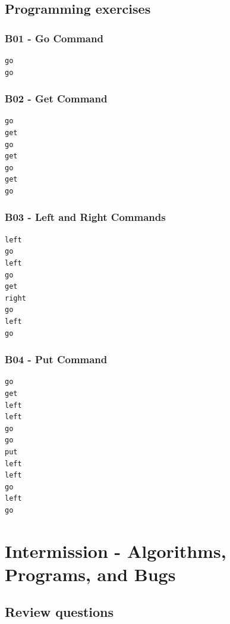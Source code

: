 \documentclass[article,A4,12pt]{llncs}
\begin{document}
\subsection{Programming exercises}

\subsubsection*{B01 - Go Command}
\begin{verbatim}
go
go
\end{verbatim}

\subsubsection{B02 - Get Command}
\begin{verbatim}
go
get
go
get
go
get 
go
\end{verbatim}

\subsubsection{B03 - Left and Right Commands}
\begin{verbatim}
left
go
left
go
get
right
go
left
go
\end{verbatim}

\subsubsection{B04 - Put Command}
\begin{verbatim}
go
get
left
left
go
go
put
left
left
go
left 
go
\end{verbatim}

\section{Intermission - Algorithms, Programs, and Bugs}

\subsection{Review questions}
\end{document}
